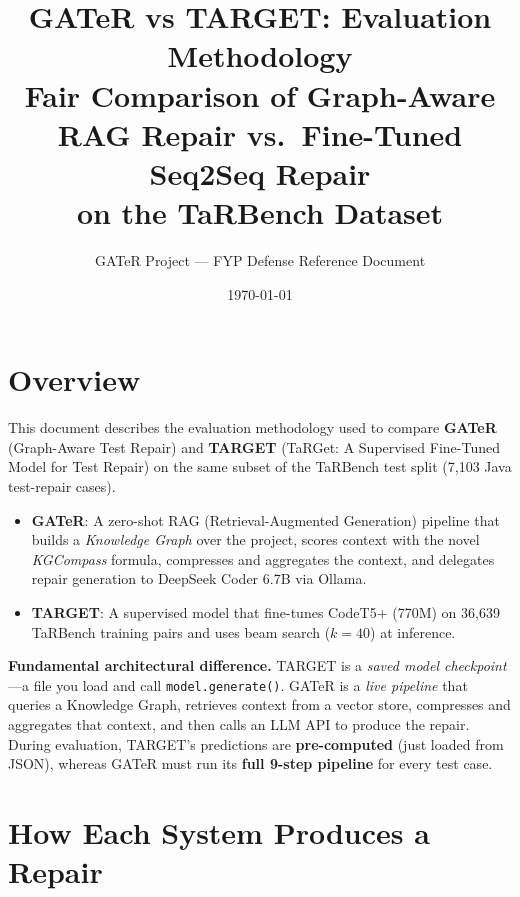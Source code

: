 \documentclass[11pt,a4paper]{article}
\title{\textbf{GATeR vs TARGET: Evaluation Methodology}\\[0.5em]
\large Fair Comparison of Graph-Aware RAG Repair vs.\ Fine-Tuned Seq2Seq Repair\\
on the TaRBench Dataset}
\author{GATeR Project --- FYP Defense Reference Document}
\date{\today}
\begin{document}
\maketitle

\section{Overview}

This document describes the evaluation methodology used to compare
\textbf{GATeR} (Graph-Aware Test Repair) and \textbf{TARGET}
(TaRGet: A Supervised Fine-Tuned Model for Test Repair)
on the same subset of the TaRBench test split (7,103 Java test-repair cases).

\begin{itemize}
    \item \textbf{GATeR}: A zero-shot RAG (Retrieval-Augmented Generation)
          pipeline that builds a \emph{Knowledge Graph} over the project,
          scores context with the novel \emph{KGCompass} formula, compresses
          and aggregates the context, and delegates repair generation to
          DeepSeek Coder 6.7B via Ollama.
    \item \textbf{TARGET}: A supervised model that fine-tunes CodeT5+ (770M)
          on 36,639 TaRBench training pairs and uses beam search ($k{=}40$)
          at inference.
\end{itemize}

\textbf{Fundamental architectural difference.}
TARGET is a \emph{saved model checkpoint}---a file you load and call
\texttt{model.generate()}.
GATeR is a \emph{live pipeline} that queries a Knowledge Graph, retrieves
context from a vector store, compresses and aggregates that context, and
then calls an LLM API to produce the repair.
During evaluation, TARGET's predictions are \textbf{pre-computed} (just loaded
from JSON), whereas GATeR must run its \textbf{full 9-step pipeline} for every
test case.

\section{How Each System Produces a Repair}
\label{sec:systems}
\end{document}
